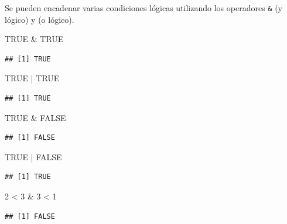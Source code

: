 \documentclass[
]{book}
\newenvironment{Shaded}{\begin{snugshade}}{\end{snugshade}}
\newcommand{\ConstantTok}[1]{\textcolor[rgb]{0.00,0.00,0.00}{#1}}
\newcommand{\DecValTok}[1]{\textcolor[rgb]{0.00,0.00,0.81}{#1}}
\newcommand{\SpecialCharTok}[1]{\textcolor[rgb]{0.00,0.00,0.00}{#1}}
\theoremstyle{break}
\theoremstyle{nonumberplain}
\begin{document}
Se pueden encadenar varias condiciones lógicas utilizando los operadores \texttt{\&} (y lógico) y \texttt{\textbar{}} (o lógico).

\begin{Shaded}
\begin{Highlighting}[]
\ConstantTok{TRUE} \SpecialCharTok{\&} \ConstantTok{TRUE}
\end{Highlighting}
\end{Shaded}

\begin{verbatim}
## [1] TRUE
\end{verbatim}

\begin{Shaded}
\begin{Highlighting}[]
\ConstantTok{TRUE} \SpecialCharTok{|} \ConstantTok{TRUE}
\end{Highlighting}
\end{Shaded}

\begin{verbatim}
## [1] TRUE
\end{verbatim}

\begin{Shaded}
\begin{Highlighting}[]
\ConstantTok{TRUE} \SpecialCharTok{\&} \ConstantTok{FALSE}
\end{Highlighting}
\end{Shaded}

\begin{verbatim}
## [1] FALSE
\end{verbatim}

\begin{Shaded}
\begin{Highlighting}[]
\ConstantTok{TRUE} \SpecialCharTok{|} \ConstantTok{FALSE}
\end{Highlighting}
\end{Shaded}

\begin{verbatim}
## [1] TRUE
\end{verbatim}

\begin{Shaded}
\begin{Highlighting}[]
\DecValTok{2} \SpecialCharTok{\textless{}} \DecValTok{3} \SpecialCharTok{\&} \DecValTok{3} \SpecialCharTok{\textless{}} \DecValTok{1}
\end{Highlighting}
\end{Shaded}

\begin{verbatim}
## [1] FALSE
\end{verbatim}
\end{document}
